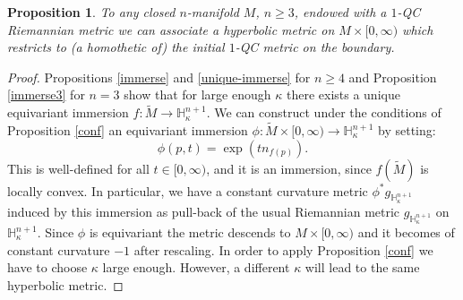 \documentclass[10pt]{amsart}
\newtheorem{proposition}[theorem]{Proposition}
\theoremstyle{definition}
\theoremstyle{remark}
\numberwithin{equation}{section}
\begin{document}
\begin{proposition}\label{hyperbolicmetric}
To any closed $n$-manifold $M$, $n\geq3$, endowed with a $1$-QC Riemannian metric we can associate
a hyperbolic metric on $M\times [0,\infty)$ which restricts to (a homothetic of)
the initial $1$-QC metric on the boundary.
\end{proposition}
\begin{proof}
Propositions \ref{immerse} and \ref{unique-immerse} for $n\geq4$ and Proposition \ref{immerse3} for $n=3$ show that for large enough $\kappa$ there exists a unique equivariant immersion $f:\widetilde{M}\to \mathbb H_{\kappa}^{n+1}$.
We can construct under the conditions of Proposition \ref{conf} an equivariant immersion
$\phi:\widetilde{M}\times [0,\infty) \to \mathbb H_{\kappa}^{n+1}$
by setting:
\[ \phi(p, t)=\exp(t n_{f(p)}).\]
This is well-defined for all $t\in [0, \infty)$,
and it is an immersion, since $f(\widetilde{M})$ is locally convex.
In particular, we have a constant
curvature metric $\phi^*g_{\mathbb H_{\kappa}^{n+1}}$ induced by this immersion
as pull-back of the usual Riemannian metric $g_{\mathbb H_{\kappa}^{n+1}}$ on
$\mathbb H_{\kappa}^{n+1}$. Since $\phi$ is equivariant the metric descends to
$M\times [0,\infty)$ and it becomes of constant curvature $-1$ after rescaling.
In order to apply Proposition \ref{conf} we have to choose
$\kappa$ large enough. However, a different $\kappa$ will lead to the same
hyperbolic metric.
\end{proof}
\end{document}
